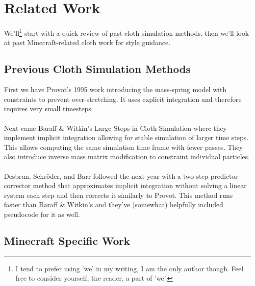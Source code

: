 \documentclass[12pt]{article}
\begin{document}
\section{Related Work}

We'll\footnote{I tend to prefer using 'we' in my writing, I am the only author though. Feel free to consider yourself, the reader, a part of 'we'.} start with a quick review of past cloth simulation methods, then we'll look at past Minecraft-related cloth work for style guidance.

\subsection{Previous Cloth Simulation Methods}

First we have Provot's 1995 work \cite{Provot1995:17} introducing the mass-spring model with constraints to prevent over-stretching. It uses explicit integration and therefore requires very small timesteps.\\
\\
Next came Baraff \& Witkin's Large Steps in Cloth Simulation \cite{largesteps} where they implement implicit integration allowing for stable simulation of larger time steps. This allows computing the same simulation time frame with fewer passes. They also introduce inverse mass matrix modification to constraint individual particles.\\
\\
Desbrun, Schröder, and Barr followed the next year \cite{interanim} with a two step predictor-corrector method that approximates implicit integration without solving a linear system each step and then corrects it similarly to Provot. This method runs faster than Baraff \& Witkin's and they've (somewhat) helpfully included pseudocode for it as well.\\

\subsection{Minecraft Specific Work}
\end{document}

